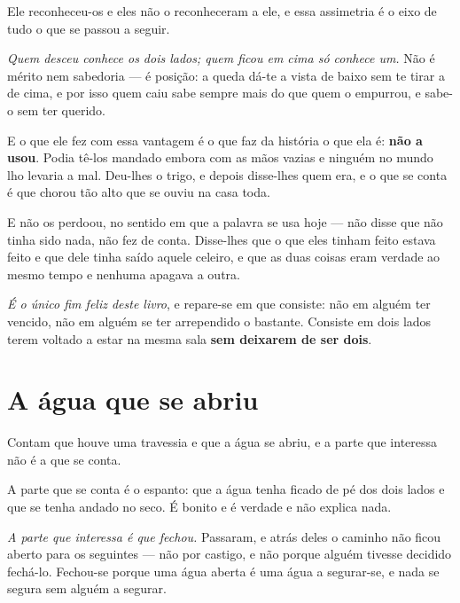 \documentclass[livro.tex]{subfiles}
\begin{document}
Ele reconheceu-os e eles não o reconheceram a ele, e essa assimetria é o eixo de tudo o que se
passou a seguir.

\medskip

\emph{Quem desceu conhece os dois lados; quem ficou em cima só conhece um.} Não é mérito nem
sabedoria --- é posição: a queda dá-te a vista de baixo sem te tirar a de cima, e por isso quem
caiu sabe sempre mais do que quem o empurrou, e sabe-o sem ter querido.

\medskip

E o que ele fez com essa vantagem é o que faz da história o que ela é: \textbf{não a usou}. Podia
tê-los mandado embora com as mãos vazias e ninguém no mundo lho levaria a mal. Deu-lhes o trigo, e
depois disse-lhes quem era, e o que se conta é que chorou tão alto que se ouviu na casa toda.

\medskip

E não os perdoou, no sentido em que a palavra se usa hoje --- não disse que não tinha sido nada,
não fez de conta. Disse-lhes que o que eles tinham feito estava feito e que dele tinha saído
aquele celeiro, e que as duas coisas eram verdade ao mesmo tempo e nenhuma apagava a outra.

\medskip

\emph{É o único fim feliz deste livro}, e repare-se em que consiste: não em alguém ter vencido, não
em alguém se ter arrependido o bastante. Consiste em dois lados terem voltado a estar na mesma
sala \textbf{sem deixarem de ser dois}.


\chapter{A água que se abriu}

Contam que houve uma travessia e que a água se abriu, e a parte que interessa não é a que se
conta.

\medskip

A parte que se conta é o espanto: que a água tenha ficado de pé dos dois lados e que se tenha
andado no seco. É bonito e é verdade e não explica nada.

\medskip

\emph{A parte que interessa é que fechou.} Passaram, e atrás deles o caminho não ficou aberto para
os seguintes --- não por castigo, e não porque alguém tivesse decidido fechá-lo. Fechou-se porque
uma água aberta é uma água a segurar-se, e nada se segura sem alguém a segurar.
\end{document}
